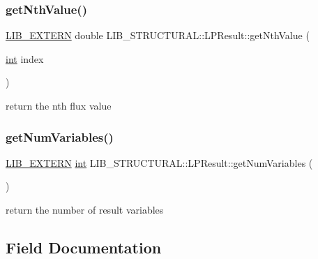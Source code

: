 \subsubsection{\texorpdfstring{get\+Nth\+Value()}{getNthValue()}}
{\footnotesize\ttfamily \hyperlink{libutil_8h_a48cc004c21e097c0d7c1c5fa8dc03b96}{L\+I\+B\+\_\+\+E\+X\+T\+E\+RN} double L\+I\+B\+\_\+\+S\+T\+R\+U\+C\+T\+U\+R\+A\+L\+::\+L\+P\+Result\+::get\+Nth\+Value (\begin{DoxyParamCaption}\item[{\hyperlink{lp__lib_8h_adeb9ec6400320e4923ac9d836d509ddb}{int}}]{index }\end{DoxyParamCaption})\hspace{0.3cm}{\ttfamily [inline]}}



return the nth flux value 

\mbox{\label{class_l_i_b___s_t_r_u_c_t_u_r_a_l_1_1_l_p_result_a0547e8a476bc55cc4bd2affebd140f16}} 
\subsubsection{\texorpdfstring{get\+Num\+Variables()}{getNumVariables()}}
{\footnotesize\ttfamily \hyperlink{libutil_8h_a48cc004c21e097c0d7c1c5fa8dc03b96}{L\+I\+B\+\_\+\+E\+X\+T\+E\+RN} \hyperlink{lp__lib_8h_adeb9ec6400320e4923ac9d836d509ddb}{int} L\+I\+B\+\_\+\+S\+T\+R\+U\+C\+T\+U\+R\+A\+L\+::\+L\+P\+Result\+::get\+Num\+Variables (\begin{DoxyParamCaption}{ }\end{DoxyParamCaption})\hspace{0.3cm}{\ttfamily [inline]}}



return the number of result variables 



\subsection{Field Documentation}
\mbox{\label{class_l_i_b___s_t_r_u_c_t_u_r_a_l_1_1_l_p_result_a8f6e0cb975a2f74d448d127938c18e9b}} 
